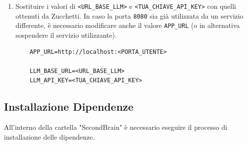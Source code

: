 \documentclass[a4paper,10pt]{article}
\begin{document}
\begin{enumerate}
\begin{lstlisting}
    MEMCACHED_HOST=127.0.0.1

    REDIS_CLIENT=phpredis
    REDIS_HOST=127.0.0.1
    REDIS_PASSWORD=null
    REDIS_PORT=6379

    MAIL_MAILER=log
    MAIL_SCHEME=null
    MAIL_HOST=127.0.0.1
    MAIL_PORT=2525
    MAIL_USERNAME=null
    MAIL_PASSWORD=null
    MAIL_FROM_ADDRESS="hello@example.com"
    MAIL_FROM_NAME="${APP_NAME}"

    AWS_ACCESS_KEY_ID=
    AWS_SECRET_ACCESS_KEY=
    AWS_DEFAULT_REGION=us-east-1
    AWS_BUCKET=
    AWS_USE_PATH_STYLE_ENDPOINT=false

    VITE_APP_NAME="${APP_NAME}"
    VITE_DEV_SERVER_URL=http://localhost:5173

    LLM_BASE_URL=<URL_BASE_LLM>
    LLM_API_KEY=<TUA_CHIAVE_API_KEY>
    # Modelli ['qwen3:30b','devstral:24b','gpt-oss:20b','gemma3:27b','gemma3:1b','deepseek-r1:8b','qwen3:1.7b']
    LLM_MODEL=gemma3:4b
  \end{lstlisting}

  \item Sostituire i valori di \verb|<URL_BASE_LLM>| e \verb|<TUA_CHIAVE_API_KEY>| con quelli ottenuti da Zucchetti. In caso la porta \texttt{8080} sia già utilizzata da un servizio differente, è necessario modificare anche il valore \verb|APP_URL| (o in alternativa sospendere il servizio utilizzante).
  
  \begin{lstlisting}
    APP_URL=http://localhost:<PORTA_UTENTE>

    LLM_BASE_URL=<URL_BASE_LLM>      
    LLM_API_KEY=<TUA_CHIAVE_API_KEY>
  \end{lstlisting}
\end{enumerate}

\subsection{Installazione Dipendenze}
  All'interno della cartella "SecondBrain" è necessario eseguire il processo di installazione delle dipendenze.
\end{document}
